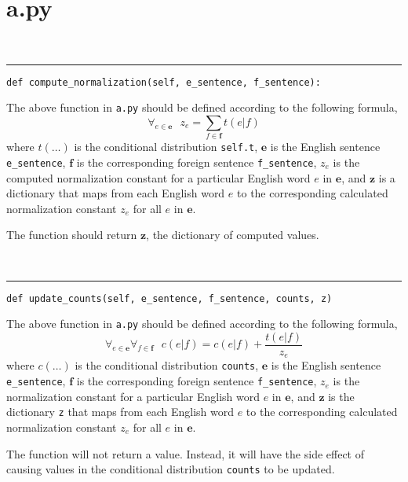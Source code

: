 \documentclass[]{article}
\begin{document}
\section*{a.py}

\ \\
\noindent\rule[0.5ex]{\linewidth}{1pt}

\begin{verbatim}
def compute_normalization(self, e_sentence, f_sentence):
\end{verbatim}

The above function in \texttt{a.py} should be defined according to the following formula,
%
\begin{equation}
\forall_{e \in {\bm e}} \ \ \ z_e = \sum_{f \in {\bm f}} t(e|f)
\end{equation}
%
where $t(\ldots)$ is the conditional distribution \texttt{self.t}, ${\bm e}$ is the English sentence \texttt{e\_sentence}, ${\bm f}$ is the corresponding foreign sentence \texttt{f\_sentence}, $z_e$ is the computed normalization constant for a particular English word $e$ in $\bm{e}$, and $\bm{z}$ is a dictionary that maps from each English word $e$ to the corresponding calculated normalization constant $z_e$ for all $e$ in $\bm{e}$.

The function should return $\bm{z}$, the dictionary of computed values.

\ \\
\noindent\rule[0.5ex]{\linewidth}{1pt}

\begin{verbatim}
def update_counts(self, e_sentence, f_sentence, counts, z)
\end{verbatim}

The above function in \texttt{a.py} should be defined according to the following formula,
%
\begin{equation}
\forall_{e \in \bm{e}} \forall_{f \in \bm{f}} \ \ \ c(e|f) = c(e|f) + \frac{t(e|f)}{z_e}
\end{equation}
%
where $c(\ldots)$ is the conditional distribution \texttt{counts}, ${\bm e}$ is the English sentence \texttt{e\_sentence}, ${\bm f}$ is the corresponding foreign sentence \texttt{f\_sentence}, $z_e$ is the normalization constant for a particular English word $e$ in $\bm{e}$, and $\bm{z}$ is the dictionary \texttt{z} that maps from each English word $e$ to the corresponding calculated normalization constant $z_e$ for all $e$ in $\bm{e}$.

The function will not return a value. Instead, it will have the side effect of causing values in the conditional distribution \texttt{counts} to be updated.
\end{document}
